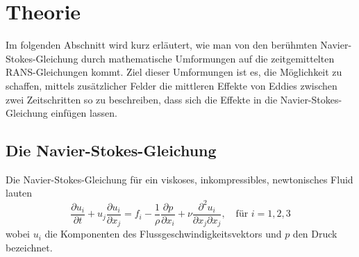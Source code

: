 %
%
%
%
\section{Theorie\label{reynolds:section:teil0}}
%
Im folgenden Abschnitt wird kurz erläutert, wie man von den berühmten Navier-Stokes-Gleichung
durch mathematische Umformungen auf die zeitgemittelten RANS-Gleichungen kommt.
%
Ziel dieser Umformungen ist es, die Möglichkeit zu schaffen, mittels zusätzlicher Felder
die mittleren Effekte von Eddies zwischen zwei Zeitschritten so zu beschreiben, dass sich die
Effekte in die Navier-Stokes-Gleichung einfügen lassen.
%
\subsection{Die Navier-Stokes-Gleichung}
%
Die Navier-Stokes-Gleichung für ein viskoses, inkompressibles, newtonisches Fluid lauten
%
\begin{equation}
    \label{reynolds:eqs:impulse}
    \frac{\partial u_i}{\partial t} + u_j \frac{\partial u_i}{\partial x_j} =
        f_i - \frac{1}{\rho} \frac{\partial p}{\partial x_i} + 
        \nu \frac{\partial^2 u_i}{\partial x_j \partial x_j},\quad\text{für $i = 1,2,3$}
\end{equation}
%
wobei $u_i$ die Komponenten des Flussgeschwindigkeitsvektors und $p$ den Druck bezeichnet.

